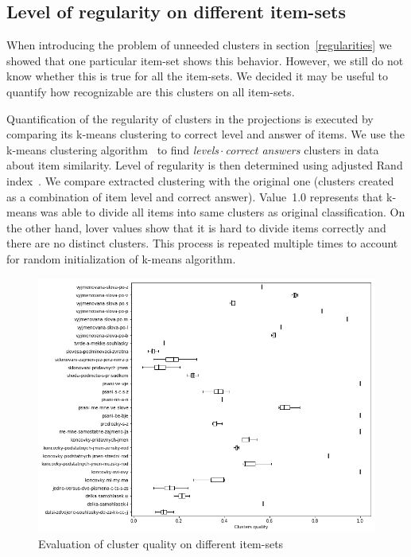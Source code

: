 \documentclass[
  printed, %
  table,   %
  nolof,     %
  nolot,     %
  color,
  final,
  nocover
]{fithesis3}
\begin{document}

\subsection{Level of regularity on different item-sets}\label{level-of-regularity-on-different-item-sets}

When introducing the problem of unneeded clusters in section~\ref{regularities} we showed that one particular item-set shows this behavior. However, we still do not know whether this is true for all the item-sets. We decided it may be useful to quantify how recognizable are this clusters on all item-sets.


Quantification of the regularity of clusters in the projections is executed by comparing its k-means clustering to correct level and answer of items. We use the k-means clustering algorithm~\cite{hartigan1979algorithm} to find \textit{levels\,$\cdot$\,correct answers} clusters in data about item similarity. Level of regularity is then determined using adjusted Rand index~\cite{santos2009use}. We compare extracted clustering with the original one (clusters created as a combination of item level and correct answer). Value~1.0 represents that k-means was able to divide all items into same clusters as original classification. On the other hand, lover values show that it is hard to divide items correctly and there are no distinct clusters. This process is repeated multiple times to account for random initialization of k-means algorithm.

\begin{figure}
  \includegraphics[width=\textwidth]{img/clustering_quality}
  \caption{Evaluation of cluster quality on different item-sets}
  \label{fig:clustering_quality}
\end{figure}
\end{document}
